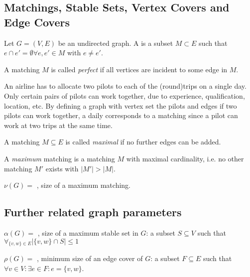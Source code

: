 \begin{lec}[2011-10-31]\end{lec}

\subsection*{Matchings, Stable Sets, Vertex Covers and Edge Covers}


\begin{defn}
Let $G = (V, E)$ be an undirected graph. A  is a
subset $M \subset E$ such that $e \cap e' = \emptyset \forall e, e' \in M$
with $e \neq e'$.

A matching $M$ is called \emph{perfect} if all vertices are incident to
some edge in $M$.
\end{defn}

\begin{xmp+}
An airline has to allocate two pilots to each of the (round)trips on a
single day. Only certain pairs of pilots can work together, due to
experience, qualification, location, etc. By defining a graph with vertex
set the pilots and edges if two pilots can work together, a daily
corresponds to a matching since a pilot can work at two trips at the same
time.
\end{xmp+}

\begin{defn}
A matching $M \subseteq E$ is called \emph{maximal} if no further edges can
be added.

A \emph{maximum} matching is a matching $M$ with maximal cardinality, i.e.
no other matching $M'$ exists with $|M'| > |M|$.

$\nu(G) =$ , size of a maximum matching.
\end{defn}

\subsection*{Further related graph parameters}
$\alpha(G) = $ , size of a maximum stable set in
$G$: a subset $S \subseteq V$ such that $\forall_{\{v, w\} \in E} \left|
\{v, w\} \cap S \right| \leq 1$

$\rho(G) = $ , minimum size of an
edge cover of $G$: a subset $F \subseteq E$ such that $\forall v \in V:
\exists e \in F: e = \{ v, w \}$.

